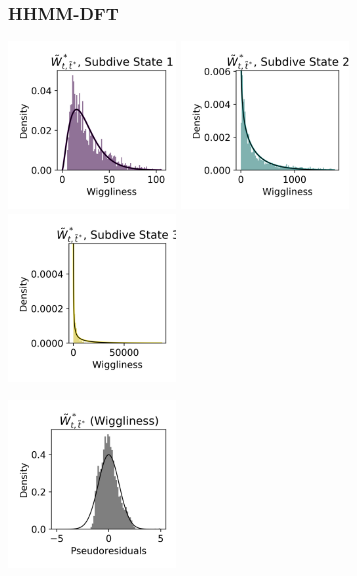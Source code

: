 \documentclass{article}
\begin{document}
        \subsubsection{HHMM-DFT}
        
        \begin{center}
        \includegraphics[width=1.75in]{../Plots/HHMM_empirical_hist_ahat_0.png}
        \includegraphics[width=1.75in]{../Plots/HHMM_empirical_hist_ahat_1.png}
        \includegraphics[width=1.75in]{../Plots/HHMM_empirical_hist_ahat_2.png}
        
        \includegraphics[width=1.75in]{../Plots/HHMM_psedoresids_ahat.png}
        \end{center}
        
\end{document}
